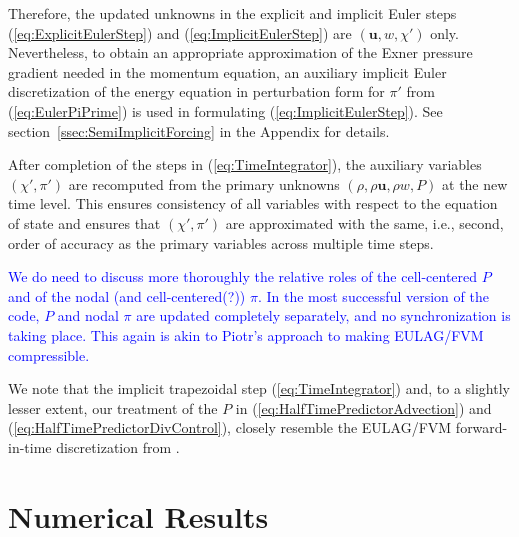 \documentclass{ametsoc}
\theoremstyle{definition}
\newcommand{\klein}[1]{\textcolor{blue}{#1}}
\newcommand{\eq}[1]{(\ref{#1})}
\newcommand{\vect}[1]{{\mathbf{#1}}}
\newcommand{\vu}{\vect{u}}
\newcommand{\chiprime}{{\chi'}}
\newcommand{\piprime}{\pi'}
\begin{document}
Therefore, the updated unknowns in the explicit and 
implicit Euler steps \eq{eq:ExplicitEulerStep} and \eq{eq:ImplicitEulerStep} 
are $(\vu, w, \chiprime)$ only. Nevertheless, to obtain 
an appropriate approximation of the Exner pressure gradient needed in the 
momentum equation, an auxiliary implicit Euler discretization of the energy 
equation in perturbation form for $\piprime$ from \eq{eq:EulerPiPrime} is 
used in formulating \eq{eq:ImplicitEulerStep}. See 
section~\ref{ssec:SemiImplicitForcing} in the Appendix for details. 

After completion of the steps in \eq{eq:TimeIntegrator}, the auxiliary variables $(\chiprime, \pi')$ are recomputed from the primary
unknowns $(\rho, \rho\vu, \rho w, P)$ at the new time level. This ensures
consistency of all variables with respect to the equation of state and
ensures that $(\chiprime, \pi')$ are approximated with the same, i.e., 
second, order of accuracy as the primary variables across multiple time 
steps. 

\klein{We do need to discuss more thoroughly the relative roles of the cell-centered $P$ and of the nodal (and cell-centered(?)) $\pi$. In the most successful version of the code, $P$ and nodal $\pi$ are updated completely separately, and no synchronization is taking place. This again is akin to Piotr's approach to making EULAG/FVM compressible.}

We note that the implicit trapezoidal step \eq{eq:TimeIntegrator} and, to a slightly lesser extent, our treatment of the $P$ in \eq{eq:HalfTimePredictorAdvection} and \eq{eq:HalfTimePredictorDivControl}, closely resemble the EULAG/FVM forward-in-time discretization from \citep{PrusaEtAl2008,SmolarkiewiczEtAl2014, SmolarkiewiczEtAl2016, KuehnleinEtAl2018}.




\section{Numerical Results}
\label{sec:Results}
\end{document}
